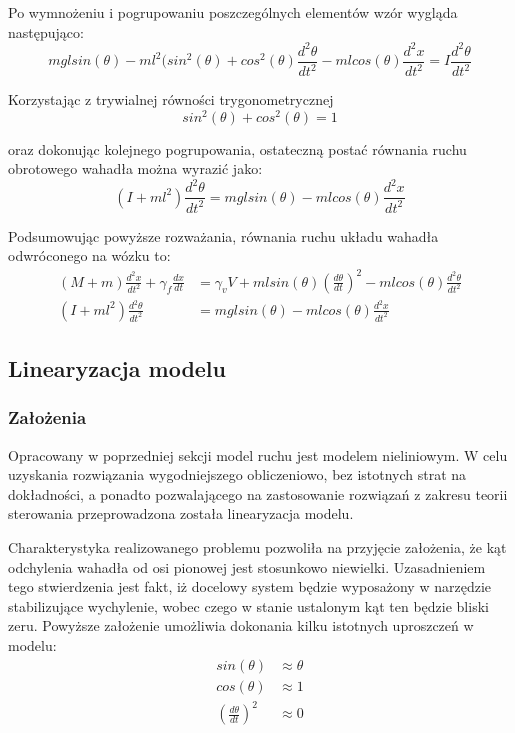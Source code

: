 \documentclass[12pt, twoside, openany]{report}
\theoremstyle{definition}
\begin{document}
Po wymnożeniu i pogrupowaniu poszczególnych elementów wzór wygląda następująco:
\begin{equation}
mglsin(\theta) - ml^2(sin^2(\theta) + cos^2(\theta) \frac{d^2\theta}{dt^2} - mlcos(\theta) \frac{d^2x}{dt^2} = I\frac{d^2\theta}{dt^2}
\end{equation}

Korzystając z trywialnej równości trygonometrycznej
\begin{equation}
sin^2(\theta) + cos^2(\theta) = 1
\end{equation}

oraz dokonując kolejnego pogrupowania, ostateczną postać równania ruchu obrotowego wahadła można wyrazić jako:
\begin{equation}
(I + ml^2)\frac{d^2\theta}{dt^2} = mglsin(\theta) - mlcos(\theta)\frac{d^2x}{dt^2}
\end{equation}

Podsumowując powyższe rozważania, równania ruchu układu wahadła odwróconego na wózku to:
\begin{equation} \label{Equations}
\begin{aligned}
(M + m) \frac{d^2x}{dt^2} + \gamma_f \frac{dx}{dt} &= \gamma_v V + mlsin(\theta)(\frac{d\theta}{dt})^2 - mlcos(\theta) \frac{d^2\theta}{dt^2}\\
(I + ml^2)\frac{d^2\theta}{dt^2} &= mglsin(\theta) - mlcos(\theta)\frac{d^2x}{dt^2}
\end{aligned}
\end{equation}

\subsection{Linearyzacja modelu}
\subsubsection{Założenia}
Opracowany w poprzedniej sekcji model ruchu jest modelem nieliniowym. W celu uzyskania rozwiązania wygodniejszego obliczeniowo, bez istotnych strat na dokładności, a ponadto pozwalającego na zastosowanie rozwiązań z zakresu teorii sterowania przeprowadzona została linearyzacja modelu. 

Charakterystyka realizowanego problemu pozwoliła na przyjęcie założenia, że kąt odchylenia wahadła od osi pionowej jest stosunkowo niewielki. Uzasadnieniem tego stwierdzenia jest fakt, iż docelowy system będzie wyposażony w narzędzie stabilizujące wychylenie, wobec czego w stanie ustalonym kąt ten będzie bliski zeru. Powyższe założenie umożliwia dokonania kilku istotnych uproszczeń w modelu:
\begin{equation}
\begin{aligned}
sin(\theta) &\approx \theta \\
cos(\theta) &\approx 1 \\
(\frac{d\theta}{dt})^2 &\approx 0
\end{aligned}
\end{equation}
\end{document}
